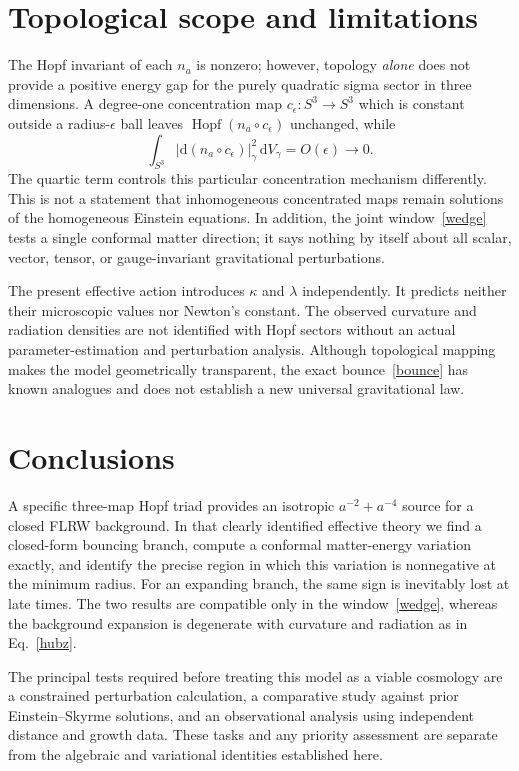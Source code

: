 \documentclass[aps,prd,reprint,longbibliography,nofootinbib,superscriptaddress]{revtex4-2}
\newcommand{\dd}{\mathrm d}
\newcommand{\Hopf}{\operatorname{Hopf}}
\begin{document}
\section{Topological scope and limitations}
The Hopf invariant of each $n_a$ is nonzero; however, topology \emph{alone} does not provide a positive energy gap for the purely quadratic sigma sector in three dimensions. A degree-one concentration map $c_\epsilon:S^3\to S^3$ which is constant outside a radius-$\epsilon$ ball leaves $\Hopf(n_a\circ c_\epsilon)$ unchanged, while
\begin{equation}\label{collapse}
 \int_{S^3}|\dd(n_a\circ c_\epsilon)|_\gamma^2\,\dd V_\gamma
 =O(\epsilon)\longrightarrow0.
\end{equation}
The quartic term controls this particular concentration mechanism differently. This is not a statement that inhomogeneous concentrated maps remain solutions of the homogeneous Einstein equations. In addition, the joint window~\eqref{wedge} tests a single conformal matter direction; it says nothing by itself about all scalar, vector, tensor, or gauge-invariant gravitational perturbations.

The present effective action introduces $\kappa$ and $\lambda$ independently. It predicts neither their microscopic values nor Newton's constant. The observed curvature and radiation densities are not identified with Hopf sectors without an actual parameter-estimation and perturbation analysis. Although topological mapping makes the model geometrically transparent, the exact bounce~\eqref{bounce} has known analogues and does not establish a new universal gravitational law.

\section{Conclusions}
A specific three-map Hopf triad provides an isotropic $a^{-2}+a^{-4}$ source for a closed FLRW background. In that clearly identified effective theory we find a closed-form bouncing branch, compute a conformal matter-energy variation exactly, and identify the precise region in which this variation is nonnegative at the minimum radius. For an expanding branch, the same sign is inevitably lost at late times. The two results are compatible only in the window~\eqref{wedge}, whereas the background expansion is degenerate with curvature and radiation as in Eq.~\eqref{hubz}.

The principal tests required before treating this model as a viable cosmology are a constrained perturbation calculation, a comparative study against prior Einstein--Skyrme solutions, and an observational analysis using independent distance and growth data. These tasks and any priority assessment are separate from the algebraic and variational identities established here.
\end{document}

